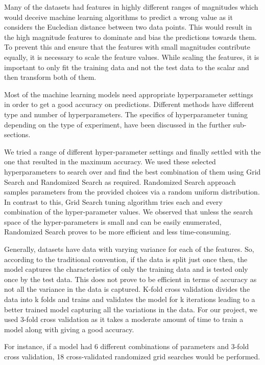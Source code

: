 \documentclass[10pt,twocolumn,letterpaper]{article}
\begin{document}
Many of the datasets had features in highly different ranges of magnitudes which would deceive machine learning algorithms to predict a wrong value as it considers the Eucledian distance between two data points. This would result in the high magnitude features to dominate and bias the predictions towards them. To prevent this and ensure that the features with small magnitudes contribute equally, it is necessary to scale the feature values. While scaling the features, it is important to only fit the training data and not the test data to the scalar and then transform both of them.

Most of the machine learning models need appropriate hyperparameter settings in order to get a good accuracy on predictions. Different methods have different type and number of hyperparameters. The specifics of hyperparameter tuning depending on the type of experiment, have been discussed in the further sub-sections.

We tried a range of different hyper-parameter settings and finally settled with the one that resulted in the maximum accuracy. We used these selected hyperparameters to search over and find the best combination of them using Grid Search and Randomized Search as required. Randomized Search approach samples parameters from the provided choices via a random uniform distribution. In contrast to this, Grid Search tuning algorithm tries each and every combination of the hyper-parameter values. We observed that unless the search space of the hyper-parameters is small and can be easily enumerated, Randomized Search proves to be more efficient and less time-consuming.

Generally, datasets have data with varying variance for each of the features. So, according to the traditional convention, if the data is split just once then, the model captures the characteristics of only the training data and is tested only once by the test data. This does not prove to be efficient in terms of accuracy as not all the variance in the data is captured. K-fold cross validation divides the data into k folds and trains and validates the model for k iterations leading to a better trained model capturing all the variations in the data. For our project, we used 3-fold cross validation as it takes a moderate amount of time to train a model along with giving a good accuracy.

For instance, if a model had 6 different combinations of parameters and 3-fold cross validation, 18 cross-validated randomized grid searches would be performed.
\end{document}
